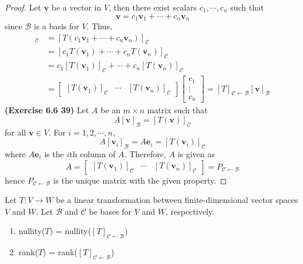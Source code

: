 \begin{proof}
	Let $\textbf{v}$ be a vector in $V$, then there exist scalars $c_1, \cdots, c_n$ such that \begin{equation*}
		\textbf{v} = c_1\textbf{v}_1 + \cdots + c_n\textbf{v}_n
	\end{equation*} since $\mathcal{B}$ is a basis for $V$. Thus, \begin{align*}
		[T(\textbf{v})]_\mathcal{C} &= [T(c_1\textbf{v}_1 + \cdots + c_n\textbf{v}_n)]_\mathcal{C} \\
		&= [c_1T(\textbf{v}_1) + \cdots + c_nT(\textbf{v}_n)]_\mathcal{C} \\
		&= c_1[T(\textbf{v}_1)]_\mathcal{C} + \cdots + c_n[T(\textbf{v}_n)]_\mathcal{C} \\
		&= \begin{bmatrix}
			\left[T(\textbf{v}_1)\right]_\mathcal{C} & \cdots & \left[T(\textbf{v}_n)\right]_\mathcal{C}
		\end{bmatrix}\begin{bmatrix}
			c_1 \\ \vdots \\ c_n
		\end{bmatrix} = [T]_\mathcal{ \mathcal{C} \leftarrow \mathcal{B} }[\textbf{v}]_\mathcal{B}
	\end{align*}
	\textbf{(Exercise 6.6 39)} Let $A$ be an $m \times n$ matrix such that \begin{equation*}
		A[\textbf{v}]_\mathcal{B} = [T(\textbf{v})]_\mathcal{C}
	\end{equation*} for all $\textbf{v} \in V$. For $i = 1, 2, \cdots, n$, \begin{equation*}
		A[\textbf{v}_i]_\mathcal{B} = A\textbf{e}_i = [T(\textbf{v}_i)]_\mathcal{C}
	\end{equation*} where $A\textbf{e}_i$ is the $i$th column of $A$. Therefore, $A$ is given as \begin{equation*}
		A = \begin{bmatrix}
			\left[T(\textbf{v}_1)\right]_\mathcal{C} & \cdots & [T(\textbf{v}_n)]_\mathcal{C}
		\end{bmatrix} = P_{ \mathcal{C} \leftarrow \mathcal{B} }
	\end{equation*} hence $P_{ \mathcal{C} \leftarrow \mathcal{B} }$ is the unique matrix with the given property.
\end{proof}

\begin{plaintheorem}
	Let $T: V \rightarrow W$ be a linear transformation between finite-dimensional vector spaces $V$ and $W$. Let $\mathcal{B}$ and $\mathcal{C}$ be bases for $V$ and $W$, respectively.
	\begin{enumerate}
		\item nullity($T$) = nullity($[T]_{ \mathcal{C} \leftarrow \mathcal{B}}$)
		\item rank($T$) = rank($[T]_{ \mathcal{C} \leftarrow \mathcal{B} }$)
	\end{enumerate}
\end{plaintheorem}

